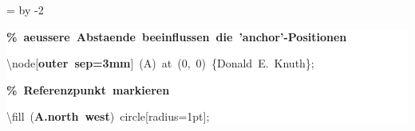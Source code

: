 \begingroup
\ttfamily
{}
=\textwidth
\advance{} by -2\fboxsep
\noindent
\colorbox{background}
{%
\parbox{\dimen255}
{%
\rule[-0.5ex]{0pt}{2.5ex}\hspace*{0.0em}\textcolor{G}{\textbf{\%~aeussere~Abstaende~beeinflussen~die~'anchor'{-}Positionen}}\\
\rule[-0.5ex]{0pt}{2.5ex}\hspace*{0.0em}\textbackslash{}node[\textcolor{R}{\textbf{outer~sep=3mm}}]~(A)~at~(0,~0)~\{Donald~E.~Knuth\};\\
\rule[-0.5ex]{0pt}{2.5ex}\hspace*{0.0em}\textcolor{G}{\textbf{\%~Referenzpunkt~markieren}}\\
\rule[-0.5ex]{0pt}{2.5ex}\hspace*{0.0em}\textbackslash{}fill~(\textcolor{R}{\textbf{A.north~west}})~circle[radius=1pt];}%
}%
\endgroup
